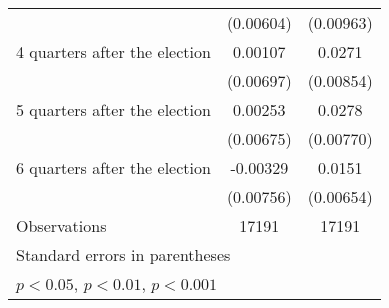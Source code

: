 \begin{table}[htbp]
\begin{tabular}{l*{2}{c}}
                    &   (0.00604)         &   (0.00963)         \\
[1em]
 4 quarters after the election&     0.00107         &      0.0271\sym{**} \\
                    &   (0.00697)         &   (0.00854)         \\
[1em]
 5 quarters after the election&     0.00253         &      0.0278\sym{***}\\
                    &   (0.00675)         &   (0.00770)         \\
[1em]
 6 quarters after the election&    -0.00329         &      0.0151\sym{*}  \\
                    &   (0.00756)         &   (0.00654)         \\
\hline
Observations        &       17191         &       17191         \\
\hline\hline
\multicolumn{3}{l}{\footnotesize Standard errors in parentheses}\\
\multicolumn{3}{l}{\footnotesize \sym{*} \(p<0.05\), \sym{**} \(p<0.01\), \sym{***} \(p<0.001\)}\\
\end{tabular}
\end{table}

